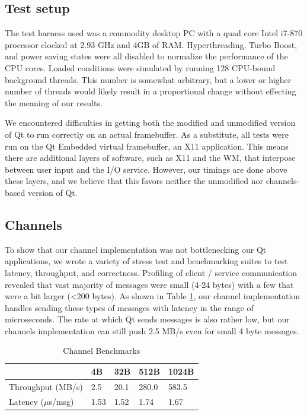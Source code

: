 \documentclass[letterpaper,twocolumn,10pt]{article}
\begin{document}
\subsection{Test setup}

The test harness used was a commodity desktop PC with a quad core Intel i7-870 processor clocked at 2.93 GHz and 4GB of RAM. Hyperthreading, Turbo Boost, and power saving states were all disabled to normalize the performance of the CPU cores. Loaded conditions were simulated by running 128 CPU-bound background threads. This number is somewhat arbitrary, but a lower or higher number of threads would likely result in a proportional change without effecting the meaning of our results.

We encountered difficulties in getting both the modified and unmodified version of Qt to run correctly on an actual framebuffer. As a substitute, all tests were run on the Qt Embedded virtual framebuffer, an X11 application. This means there are additional layers of software, such as X11 and the WM, that interpose between user input and the I/O service. However, our timings are done above these layers, and we believe that this favors neither the unmodified nor channels-based version of Qt.

\subsection{Channels}

To show that our channel implementation was not bottlenecking our Qt applications, we wrote a variety of stress test and benchmarking suites to test latency, throughput, and correctness. Profiling of client / service communication revealed that vast majority of messages were small (4-24 bytes) with a few that were a bit larger (<200 bytes). As shown in Table \ref{tab:channel}, our channel implementation handles sending these types of messages with latency in the range of microseconds. The rate at which Qt sends messages is also rather low, but our channels implementation can still push 2.5 MB/s even for small 4 byte messages.

\begin{table}[tp]
\caption{Channel Benchmarks}
\centering
\label{tab:channel}
\begin{tabular}{| l | l | l | l | l |}
\hline
						&4B 	& 32B	&512B	&1024B\\ \hline
Throughput (MB/s)		&2.5	&20.1	&280.0	&583.5\\
Latency ($\mu$s/msg)	&1.53	&1.52	&1.74	&1.67\\
\hline
\end{tabular}
\end{table}
\end{document}
